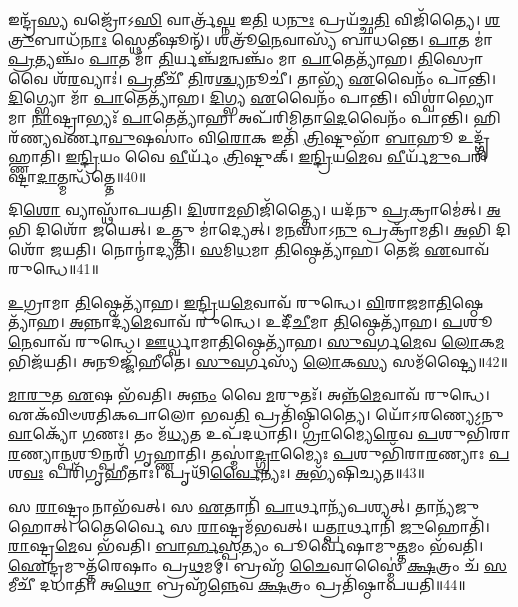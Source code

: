 𑌇𑌨𑍍𑌦𑍍𑌰᳴\-\ul{𑌸𑍍𑌯} 𑌵𑌜𑍍𑌰𑍋᳴𑌽\-\ul{𑌸𑌿} 𑌵𑌾𑌰𑍍𑌤𑍍𑌰᳴\-\ul{𑌘𑍍𑌨} 𑌇\-\ul{𑌤𑌿} 𑌧\-\ul{𑌨𑍁𑌃} 𑌪𑍍𑌰𑌯᳴𑌚𑍍𑌛\-\ul{𑌤𑌿} 𑌵𑌿𑌜𑌿᳴𑌤𑍍𑌯𑍈।
\-\ul{𑌶}\-\-\ul{𑌤𑍍𑌰𑍁}\-𑌬𑌾𑌧᳴\-\ul{𑌨𑌾𑌃} 𑌸𑍍𑌥𑍇𑌤𑍀𑌷𑍂𑌨𑍍᳴।
𑌶𑌤𑍍𑌰𑍂᳴\-\ul{𑌨𑍇}\-𑌵𑌾𑌸𑍍𑌯᳴ 𑌬𑌾𑌧𑌨𑍍𑌤𑍇।
\-\ul{𑌪𑌾}\-𑌤 𑌮𑌾॑ \ul{𑌪𑍍𑌰}\-𑌤𑍍𑌯𑌞𑍍𑌚𑌂᳴ \ul{𑌪𑌾}\-𑌤 𑌮𑌾᳴ \ul{𑌤𑌿}\-𑌰𑍍𑌯𑌞𑍍𑌚᳴\-\ul{𑌮}\-𑌨𑍍𑌵𑌞𑍍𑌚𑌂᳴ 𑌮𑌾 \ul{𑌪𑌾}\-𑌤𑍇𑌤𑍍𑌯𑌾᳴𑌹।
\-\ul{𑌤𑌿}\-𑌸𑍍𑌰𑍋 𑌵𑍈 𑌶᳴\-\ul{𑌰}\-𑌵𑍍𑌯𑌾𑌃॑।
\-\ul{𑌪𑍍𑌰}\-𑌤𑍀𑌚𑍀᳴ \ul{𑌤𑌿}\-𑌰\-\ul{𑌶𑍍𑌚𑍍𑌯}\-𑌨𑍂𑌚𑍀॑।
𑌤𑌾𑌭𑍍𑌯᳴ \ul{𑌏}\-𑌵𑍈𑌨𑌂᳴ 𑌪𑌾𑌨𑍍𑌤𑌿।
\-\ul{𑌦𑌿}\-𑌗𑍍𑌭𑍍𑌯𑍋 𑌮𑌾᳴ \ul{𑌪𑌾}\-𑌤𑍇𑌤𑍍𑌯𑌾᳴𑌹।
\-\ul{𑌦𑌿}\-𑌗𑍍𑌭𑍍𑌯 \ul{𑌏}\-𑌵𑍈𑌨𑌂᳴ 𑌪𑌾𑌨𑍍𑌤𑌿।
𑌵𑌿𑌶𑍍𑌵𑌾॑𑌭𑍍𑌯𑍋 𑌮𑌾 \ul{𑌨𑌾}\-𑌷𑍍𑌟𑍍𑌰𑌾𑌭𑍍𑌯𑌃᳴ \ul{𑌪𑌾}\-𑌤𑍇𑌤𑍍𑌯𑌾᳴𑌹।
𑌅𑌪᳴𑌰𑌿𑌮𑌿𑌤𑌾\-\ul{𑌦𑍇}\-𑌵𑍈𑌨𑌂᳴ 𑌪𑌾𑌨𑍍𑌤𑌿।
𑌹𑌿𑌰᳴𑌣𑍍𑌯𑌵𑌰𑍍𑌣𑌾\-\ul{𑌵𑍁}\-𑌷𑌸𑌾𑌂॑ 𑌵𑌿\-\ul{𑌰𑍋}\-𑌕 𑌇𑌤𑌿᳴ \ul{𑌤𑍍𑌰𑌿}\-𑌷𑍍𑌟𑍁𑌭𑌾᳴ \ul{𑌬𑌾}\-𑌹𑍂 𑌉𑌦𑍍𑌗𑍃᳴𑌹𑍍𑌣𑌾𑌤𑌿।
\-\ul{𑌇}\-\-\ul{𑌨𑍍𑌦𑍍𑌰𑌿}\-𑌯𑌂 𑌵𑍈 \ul{𑌵𑍀}\-𑌰𑍍𑌯𑌂᳴ \ul{𑌤𑍍𑌰𑌿}\-𑌷𑍍𑌟𑍁𑌕𑍍।
\-\ul{𑌇}\-\-\ul{𑌨𑍍𑌦𑍍𑌰𑌿}\-𑌯\-\ul{𑌮𑍇}\-𑌵 \ul{𑌵𑍀}\-𑌰𑍍𑌯᳴\-\ul{𑌮𑍁}\-𑌪𑌰𑌿᳴𑌷𑍍𑌟𑌾\-\ul{𑌦𑌾}\-𑌤𑍍𑌮𑌨𑍍𑌧᳴𑌤𑍍𑌤𑍇॥40॥\anuvakamend[𑌵𑍍𑌯𑌾𑌵𑍃᳴𑌤𑍍𑌤𑍍𑌯𑍈 \ul{𑌦𑌾}\-𑌤𑍍𑌰\-\ul{𑌮}\-𑌸𑍀𑌤𑍍𑌯𑌾᳴\-\ul{𑌹𑌾}\-𑌮𑍃\-\ul{𑌤}\-\-\ul{𑍞} 𑌹𑌿𑌰᳴𑌣𑍍𑌯𑌮𑍇𑌕\-\ul{𑌶}\-𑌤𑍋 𑌗᳴𑌮\-\ul{𑌯}\-𑌨𑍍𑌤𑍍𑌯𑌾𑌹᳴ 𑌬𑍍𑌰𑌾\-\ul{𑌹𑍍𑌮}\-𑌣𑌾 \ul{𑌨𑌾}\-𑌷𑍍𑌟𑍍𑌰𑌾𑌭𑍍𑌯𑌃᳴ \ul{𑌪𑌾}\-𑌤𑍇𑌤𑍍𑌯𑌾᳴𑌹 \ul{𑌚}\-𑌤𑍍𑌵𑌾𑌰𑌿᳴ 𑌚]

𑌦𑌿\-\ul{𑌶𑍋} 𑌵𑍍𑌯𑌾𑌸𑍍𑌥𑌾᳴𑌪𑌯𑌤𑌿।
\-\ul{𑌦𑌿}\-𑌶𑌾\-\ul{𑌮}\-𑌭𑌿𑌜𑌿᳴𑌤𑍍𑌤𑍍𑌯𑍈।
𑌯𑌦᳴𑌨𑍁 \ul{𑌪𑍍𑌰}\-𑌕𑍍𑌰𑌾𑌮𑍇॑𑌤𑍍।
\-\ul{𑌅}\-𑌭𑌿 𑌦𑌿𑌶𑍋᳴ 𑌜𑌯𑍇𑌤𑍍।
𑌉𑌤𑍍𑌤𑍁 𑌮𑌾॑𑌦𑍍𑌯𑍇𑌤𑍍।
𑌮\-\ul{𑌨}\-𑌸𑌾𑌽\-\ul{𑌨𑍁} 𑌪𑍍𑌰𑌕𑍍𑌰𑌾᳴𑌮𑌤𑌿।
\-\ul{𑌅}\-𑌭𑌿 𑌦𑌿𑌶𑍋᳴ 𑌜𑌯𑌤𑌿।
𑌨𑍋𑌨𑍍𑌮𑌾॑𑌦𑍍𑌯𑌤𑌿।
\-\ul{𑌸}\-𑌮𑌿\-\ul{𑌧}\-𑌮𑌾 \ul{𑌤𑌿}\-𑌷𑍍𑌠𑍇𑌤𑍍𑌯𑌾᳴𑌹।
𑌤𑍇𑌜᳴ \ul{𑌏}\-𑌵𑌾𑌵᳴ 𑌰𑍁𑌨𑍍𑌧𑍇॥41॥

\-\ul{𑌉}\-𑌗𑍍𑌰𑌾𑌮𑌾 \ul{𑌤𑌿}\-𑌷𑍍𑌠𑍇𑌤𑍍𑌯𑌾᳴𑌹।
\-\ul{𑌇}\-\-\ul{𑌨𑍍𑌦𑍍𑌰𑌿}\-𑌯\-\ul{𑌮𑍇}\-𑌵𑌾𑌵᳴ 𑌰𑍁𑌨𑍍𑌧𑍇।
\-\ul{𑌵𑌿}\-𑌰𑌾\-\ul{𑌜}\-𑌮𑌾\-\ul{𑌤𑌿}\-𑌷𑍍𑌠𑍇𑌤𑍍𑌯𑌾᳴𑌹।
\-\ul{𑌅}\-𑌨𑍍𑌨𑌾𑌦𑍍𑌯᳴\-\ul{𑌮𑍇}\-𑌵𑌾𑌵᳴ 𑌰𑍁𑌨𑍍𑌧𑍇।
𑌉𑌦𑍀᳴\-\ul{𑌚𑍀}\-𑌮𑌾 \ul{𑌤𑌿}\-𑌷𑍍𑌠𑍇𑌤𑍍𑌯𑌾᳴𑌹।
\-\ul{𑌪}\-𑌶𑍂\-\ul{𑌨𑍇}\-𑌵𑌾𑌵᳴ 𑌰𑍁𑌨𑍍𑌧𑍇।
\-\ul{𑌊}\-𑌰𑍍𑌧𑍍𑌵𑌾𑌮𑌾\-\ul{𑌤𑌿}\-𑌷𑍍𑌠𑍇𑌤𑍍𑌯𑌾᳴𑌹।
\-\ul{𑌸𑍁}\-\-\ul{𑌵}\-𑌰𑍍𑌗\-\ul{𑌮𑍇}\-𑌵 \ul{𑌲𑍋}\-𑌕\-\ul{𑌮}\-𑌭𑌿𑌜᳴𑌯𑌤𑌿।
𑌅𑌨𑍂𑌜𑍍𑌜𑌿᳴𑌹𑍀𑌤𑍇।
\-\ul{𑌸𑍁}\-\-\ul{𑌵}\-𑌰𑍍𑌗𑌸𑍍𑌯᳴ \ul{𑌲𑍋}\-𑌕\-\ul{𑌸𑍍𑌯} 𑌸𑌮᳴𑌷𑍍𑌟𑍍𑌯𑍈॥42॥

\-\ul{𑌮𑌾}\-\-\ul{𑌰𑍁}\-𑌤 \ul{𑌏}\-𑌷 𑌭᳴𑌵𑌤𑌿।
𑌅\-\ul{𑌨𑍍𑌨𑌂} 𑌵𑍈 \ul{𑌮}\-𑌰𑍁𑌤𑌃᳴।
𑌅𑌨𑍍𑌨᳴\-\ul{𑌮𑍇}\-𑌵𑌾𑌵᳴ 𑌰𑍁𑌨𑍍𑌧𑍇।
𑌏𑌕᳴𑌵𑌿𑍞𑌶𑌤𑌿𑌕𑌪𑌾𑌲𑍋 𑌭𑌵\-\ul{𑌤𑌿} 𑌪𑍍𑌰𑌤𑌿᳴\-𑌷𑍍𑌠𑌿𑌤𑍍𑌯𑍈।
𑌯𑍋᳴𑌽𑌰𑌣𑍍𑌯𑍇\-𑌽𑌨𑍁\-\ul{𑌵𑌾}\-𑌕𑍍𑌯𑍋᳴ \ul{𑌗}\-𑌣𑌃।
𑌤𑌂 𑌮᳴\-\ul{𑌧𑍍𑌯}\-𑌤 𑌉𑌪᳴𑌦𑌧𑌾𑌤𑌿।
\-\ul{𑌗𑍍𑌰𑌾}\-𑌮𑍍𑌯𑍈\-\ul{𑌰𑍇}\-𑌵 \ul{𑌪}\-𑌶𑍁𑌭𑌿᳴𑌰𑌾\-\ul{𑌰}\-𑌣𑍍𑌯𑌾\-\ul{𑌨𑍍𑌪}\-𑌶𑍂\-𑌨𑍍𑌪𑌰𑌿᳴ 𑌗𑍃𑌹𑍍𑌣𑌾𑌤𑌿।
𑌤𑌸𑍍𑌮𑌾॑\-\ul{𑌦𑍍𑌗𑍍𑌰𑌾}\-𑌮𑍍𑌯𑍈𑌃 \ul{𑌪}\-𑌶𑍁𑌭𑌿᳴𑌰𑌾\-\ul{𑌰}\-𑌣𑍍𑌯𑌾𑌃 \ul{𑌪}\-𑌶\-\ul{𑌵𑌃} 𑌪𑌰𑌿᳴𑌗𑍃𑌹𑍀𑌤𑌾𑌃।
𑌪𑍃𑌥𑌿᳴\-\ul{𑌰𑍍𑌵𑍈}\-𑌨𑍍𑌯𑌃।
\-\ul{𑌅}\-𑌭𑍍𑌯᳴𑌷𑌿𑌚𑍍𑌯𑌤॥43॥

𑌸 \ul{𑌰𑌾}\-𑌷𑍍𑌟𑍍𑌰𑌂 𑌨𑌾𑌭᳴𑌵𑌤𑍍।
𑌸 \ul{𑌏}\-𑌤𑌾𑌨𑌿᳴ \ul{𑌪𑌾}\-𑌰𑍍𑌥𑌾𑌨𑍍𑌯᳴𑌪𑌶𑍍𑌯𑌤𑍍।
𑌤𑌾𑌨𑍍𑌯᳴𑌜𑍁𑌹𑍋𑌤𑍍।
𑌤𑍈𑌰𑍍𑌵𑍈 𑌸 \ul{𑌰𑌾}\-𑌷𑍍𑌟𑍍𑌰𑌮᳴𑌭𑌵𑌤𑍍।
𑌯\-\ul{𑌤𑍍𑌪𑌾}\-𑌰𑍍𑌥𑌾𑌨𑌿᳴ \ul{𑌜𑍁}\-𑌹𑍋𑌤𑌿᳴।
\-\ul{𑌰𑌾}\-𑌷𑍍𑌟𑍍𑌰\-\ul{𑌮𑍇}\-𑌵 𑌭᳴𑌵𑌤𑌿।
\-\ul{𑌬𑌾}\-\-\ul{𑌰𑍍}\-\-\ul{𑌹}\-\-\ul{𑌸𑍍𑌪}\-𑌤𑍍𑌯𑌂 𑌪𑍂𑌰𑍍𑌵𑍇᳴𑌷𑌾𑌮𑍁\-\ul{𑌤𑍍𑌤}\-𑌮𑌂 𑌭᳴𑌵𑌤𑌿।
\-\ul{𑌐}\-𑌨𑍍𑌦𑍍𑌰𑌮𑍁𑌤𑍍𑌤᳴𑌰𑍇𑌷𑌾𑌂 𑌪𑍍𑌰\-\ul{𑌥}\-𑌮𑌮𑍍।
𑌬𑍍𑌰𑌹𑍍𑌮᳴ \ul{𑌚𑍈}\-𑌵𑌾𑌸𑍍𑌮𑍈॑ \ul{𑌕𑍍𑌷}\-𑌤𑍍𑌰𑌂 𑌚᳴ \ul{𑌸}\-𑌮𑍀𑌚𑍀᳴ 𑌦𑌧𑌾𑌤𑌿।
𑌅\-\ul{𑌥𑍋} 𑌬𑍍𑌰𑌹𑍍𑌮᳴\-\ul{𑌨𑍍𑌨𑍇}\-𑌵 \ul{𑌕𑍍𑌷}\-𑌤𑍍𑌰𑌂 𑌪𑍍𑌰𑌤𑌿᳴\-𑌷𑍍𑌠𑌾𑌪𑌯𑌤𑌿॥44॥

